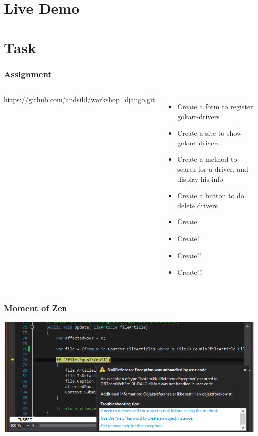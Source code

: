 \documentclass[blue]{beamer}
\begin{document}
\section{Live Demo}
\begin{frame}
    {%
        \begin{frame}[plain]
        \end{frame}
    }
\end{frame}
%
%
%

\section{Task}
\begin{frame}
  \frametitle{Assignment}   %
  \begin{columns}
      \column{4cm}
        \url{https://github.com/andsild/workshop_django.git}
        \column{6cm}
    \begin{itemize}
        \item<1> Create a form to register gokart-drivers
        \item<1> Create a site to show gokart-drivers
        \item<1> Create a method to search for a driver, and display his info
        \item<1> Create a button to do delete drivers
        \item<1> Create
        \item<1> Create!
        \item<1> Create!!
        \item<1> Create!!!
    \end{itemize}
    \end{columns}%
\end{frame}

\begin{frame}
    \frametitle{Moment of Zen}
    \centering
    \includegraphics[width=0.8\paperwidth]{./images/moment_zen.png}
\end{frame}
\end{document}
